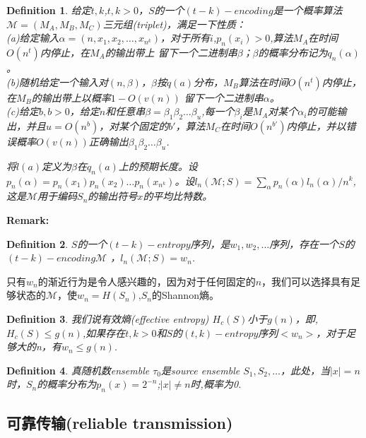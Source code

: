 \documentclass[]{article}
\newtheorem{definition}{Definition}
\begin{document}
\begin{definition}
	给定$t,k$,$t,k>0$，$S$的一个$(t-k)-encoding$是一个概率算法$\mathcal{M}=(M_A,M_B,M_C)$三元组(triplet)，满足一下性质：\\
	(a)给定输入$\alpha=(n,x_1,x_2,\ldots,x_{n^k})$，对于所有$i$,$p_n(x_i)>0$,算法$M_A$在时间$O(n^t)$内停止，在$M_A$的输出带上
	留下一个二进制串$\beta$；$\beta$的概率分布记为$q_n(\alpha)$。\\
	(b)随机给定一个输入对$(n,\beta)$，$\beta$按$q(a)$分布，$M_B$算法在时间$O(n^t)$内停止，在$M_B$的输出带上以概率$1-O(v(n))$
	留下一个二进制串$\alpha$。\\
	(c)给定$b,b>0$，给定$n$和任意串$\beta=\beta_1\beta_2\ldots\beta_u$,每一个$\beta_i$是$M_A$对某个$\alpha_i$的可能输出，并且$u=O(n^b)$，对某个固定的$b'$，算法$M_C$在时间$O(n^{b'})$内停止，并以错误概率$O(v(n))$正确输出$\beta_1\beta_2\ldots\beta_u$.\par
	将$l(a)$定义为$\beta$在$q_n(a)$上的预期长度。设$p_n(\alpha)=p_n(x_1)p_n(x_2)\ldots p_n(x_{n^k}) $。设$l_n(\mathcal{M};S)=\sum_{\alpha}p_n(\alpha)l_n(\alpha)/n^k$,这是$\mathcal{M}$用于编码$S_n$的输出符号$x$的平均比特数。
\end{definition}

\textbf{Remark:}\hspace{0.5cm}


\begin{definition}
	$S$的一个$(t-k)-entropy$序列，是$w_1,w_2,\ldots$序列，存在一个$S$的$(t-k)-encoding \mathcal{M}$ ，$l_n(\mathcal{M};S)=w_n$.
\end{definition}


只有$w_n$的渐近行为是令人感兴趣的，因为对于任何固定的$n$，我们可以选择具有足够状态的$\mathcal{M}$，使$w_n=H(S_n)$,$S_n$的Shannon熵。


\begin{definition}
	我们说有效熵(effective entropy) $H_c(S)$小于$g(n)$，即,$H_c(S)\leq g(n)$,如果存在$t,k>0$和$S$的$(t,k)-entropy$序列$<w_n>$，对于足够大的n，有$w_n\leq g(n)$.
\end{definition}


\begin{definition}
	真随机数ensemble $\tau_0$是source ensemble $S_1,S_2,\ldots$，此处，当$|x|=n$时，$S_n$的概率分布为$p_n(x)=2^{-n}$;$|x|\neq n$时,概率为0.
\end{definition}

\subsection{可靠传输(reliable transmission)}
\end{document}
